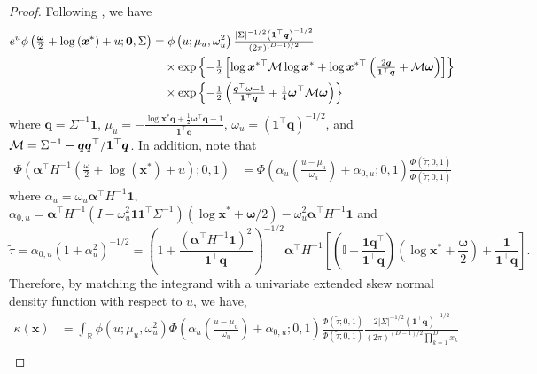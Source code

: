 \documentclass[12pt]{article}
\begin{document}
\begin{proof}
Following \citet{Wadsworth.Tawn:2014}, we have
%
\begin{align*}
e^{u} \phi\left( {\textstyle{\bm\omega\over2}} + \log\left(\bm x^*\right) + u; \bm 0, \Sigma\right) &=
\phi \left( u; \mu_u, \omega_u^2 \right) 
{\textstyle{| \Sigma |^{-1/2} \left( \bm 1^\top \bm q\right)^{-1/2}\over\left( 2\pi \right)^{(D-1)/2}}} \\
&\quad \times \exp \left\{ -{\textstyle{1\over2}} \left[ \log \bm x^{*\top} {\mathcal M} \log \bm x^* + \log \bm x^{*\top} \left( {\textstyle{2 \bm q\over\bm 1^\top \bm q}} + {\mathcal M}\bm\omega\right) \right]\right\} \\
& \quad \times \exp \left\{- {\textstyle{1\over2}} \left( {\textstyle{\bm q^\top\bm\omega - 1\over\bm 1 ^\top \bm q}} + {\textstyle{1\over4}}\bm\omega^\top{\mathcal M}\bm\omega\right) \right\}
\end{align*}
%
where $\bm q = \Sigma^{-1} \bm 1$, $\mu_u=-\frac{\log \bm x^*\bm q + \frac{1}{2} \bm\omega^\top \bm q - 1}{\bm 1^\top \bm q}$, $\omega_u=\left( \bm 1^\top \bm q \right)^{-1/2}$, and ${\mathcal M} = \Sigma^{-1} - \bm q \bm q^\top / \bm 1^\top \bm q$. In addition, note that
%
\begin{align*}
\Phi\left( \bm \alpha^\top H^{-1} \left( \frac{\bm\omega}{2} + \log\left(\bm x^*\right) + u \right); 0, 1\right) 
&= \Phi\left( \alpha_u\left(\frac{u-\mu_u}{\omega_u}\right) + \alpha_{0,u};0,1\right)\frac{\Phi(\tilde{\tau};0,1)}{\Phi(\tilde{\tau};0,1)}
\end{align*}
where $\alpha_u = \omega_u\bm\alpha^\top H^{-1}\bm 1$, $\alpha_{0,u} = \bm\alpha^\top H^{-1}\left(I - \omega_u^2\bm 1\bm 1^\top \Sigma^{-1}\right)\left(\log \bm x^*+\bm\omega/2\right) - \omega_u^2\bm\alpha^\top H^{-1}\bm 1$ and 
%
\begin{equation}
\label{eq:tilde_tau}
\tilde{\tau} = \alpha_{0,u}(1+\alpha_u^2)^{-1/2}= \left(1 + \frac{(\bm\alpha^\top H^{-1}\bm 1)^2}{\bm 1^\top \bm q}\right)^{-1/2}\bm\alpha^\top H^{-1}\left[\left(\mathbb{I} - \frac{\bm 1\bm q^\top}{\bm 1^\top\bm q}\right)\left(\log \bm x^* + \frac{\bm\omega}{2}\right) +  \frac{\bm 1}{\bm 1^\top \bm q} \right].
\end{equation}
%
Therefore, by matching the integrand with a univariate extended skew normal density function with respect to $u$,  we have,
\begin{align*}
\kappa(\bm x) &=  \int_{\mathbb R} \phi \left( u; \mu_u, \omega_u^2 \right) \Phi\left( \alpha_u\left(\frac{u-\mu_u}{\omega_u}\right) + \alpha_{0,u};0,1\right)\frac{\Phi(\tilde{\tau};0,1)}{\Phi(\tilde{\tau};0,1)}
\frac{2| \Sigma |^{-1/2} \left( \bm 1^\top \bm q\right)^{-1/2}}{\left( 2\pi \right)^{(D-1)/2}\prod_{k=1}^Dx_k} \\

\end{align*}
\end{proof}
\end{document}
